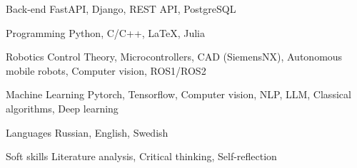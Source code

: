 

\begin{cvskills}

  \cvskill
    {Back-end} %
    {FastAPI, Django, REST API, PostgreSQL} %

  \cvskill
    {Programming} %
    {Python, C/C++, LaTeX, Julia} %

  \cvskill
    {Robotics} %
    {Control Theory, Microcontrollers, CAD (SiemensNX), Autonomous mobile robots, Computer vision, ROS1/ROS2} %

  \cvskill
    {Machine Learning}
    {Pytorch, Tensorflow, Computer vision, NLP, LLM, Classical algorithms, Deep learning}

  \cvskill
    {Languages} %
    {Russian, English, Swedish} %

  \cvskill
    {Soft skills} %
    {Literature analysis, Critical thinking, Self-reflection} %

\end{cvskills}
